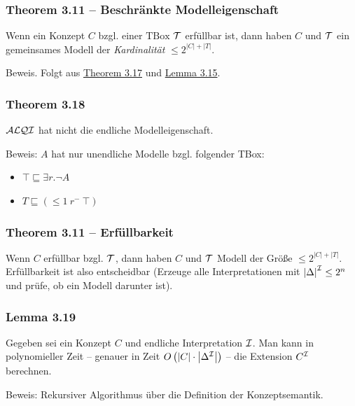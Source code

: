\subsubsection{Theorem 3.11 -- Beschränkte
Modelleigenschaft}\label{theorem-3.11-beschruxe4nkte-modelleigenschaft}

Wenn ein Konzept $C$ bzgl. einer $\text{TBox}$ $\mathcal{T}$ erfüllbar ist,
dann haben $C$ und $\mathcal{T}$ ein gemeinsames Modell der
\emph{Kardinalität} $\leq 2^{\left| C \right| + |T|}$.

Beweis. Folgt aus \protect\hyperlink{theorem-3.17}{Theorem 3.17} und
\protect\hyperlink{lemma-3.15}{Lemma 3.15}.

\subsubsection{Theorem 3.18}\label{theorem-3.18}

$\mathcal{A}\mathcal{L}\mathcal{Q}\mathcal{I}$ hat nicht die endliche Modelleigenschaft.

Beweis: $A$ hat nur unendliche Modelle bzgl. folgender TBox:

\begin{itemize}
\item
  $\top \sqsubseteq \exists r.\neg A$
\item
  $T \sqsubseteq ( \leq 1\ r^{-}\ \top)$
\end{itemize}

\subsubsection{Theorem 3.11 --
Erfüllbarkeit}\label{theorem-3.11-erfuxfcllbarkeit}

Wenn $C$ erfüllbar bzgl. $\mathcal{T}$, dann haben $C$ und $\mathcal{T}$ Modell der
Größe $\leq 2^{\left| C \right| + \left| T \right|}$. Erfüllbarkeit
ist also entscheidbar (Erzeuge alle Interpretationen mit
$\left| \Delta \right|^{\mathcal{I}} \leq 2^{n}$ und prüfe, ob ein Modell
darunter ist).

\subsubsection{Lemma 3.19}\label{lemma-3.19}

Gegeben sei ein Konzept $C$ und endliche Interpretation $\mathcal{I}$. Man
kann in polynomieller Zeit -- genauer in Zeit
$O\left( \left| C \right| \cdot \left| \Delta^{\mathcal{I}} \right| \right)$ --
die Extension $C^{\mathcal{I}}$ berechnen.

Beweis: Rekursiver Algorithmus über die Definition der Konzeptsemantik.


